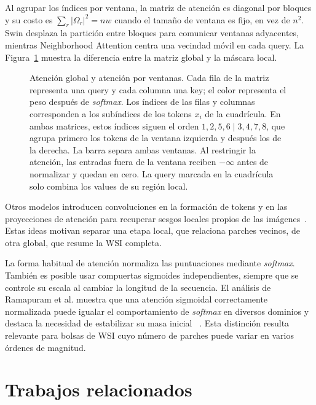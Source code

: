 Al agrupar los índices por ventana, la matriz de atención es diagonal por
bloques y su costo es
\(\sum_r|\Omega_r|^2=nw\) cuando el tamaño de ventana es fijo, en vez de
\(n^2\). Swin desplaza la partición entre bloques para comunicar ventanas
adyacentes, mientras Neighborhood Attention centra una vecindad móvil en cada
query. La Figura~\ref{fig:atencion-ventanas-mapa} muestra la diferencia
entre la matriz global y la máscara local.

\begin{figure}[htbp]
    \centering
    \resizebox{0.92\textwidth}{!}{}
    \caption{Atención global y atención por ventanas. Cada fila de la matriz
    representa una query y cada columna una key; el color representa el
    peso después de \emph{softmax}. Los índices de las filas y columnas
    corresponden a los subíndices de los tokens \(x_i\) de la cuadrícula.
    En ambas matrices, estos índices siguen el orden
    \(1,2,5,6\mid3,4,7,8\), que agrupa primero los tokens de la ventana
    izquierda y después los de la derecha. La barra separa ambas ventanas.
    Al restringir la atención, las entradas
    fuera de la ventana reciben \(-\infty\) antes de normalizar y quedan en
    cero. La query marcada en la cuadrícula solo combina los values de su
    región local.}
    \label{fig:atencion-ventanas-mapa}
\end{figure}

Otros modelos introducen convoluciones en la formación de tokens y en las
proyecciones de atención para recuperar sesgos locales propios de las
imágenes~\cite{wu_cvt_2021}. Estas ideas motivan separar una etapa local, que relaciona parches vecinos, de otra
global, que resume la WSI completa.

La forma habitual de atención normaliza las puntuaciones mediante
\emph{softmax}. También es posible usar compuertas sigmoides independientes,
siempre que se controle su escala al cambiar la longitud de la secuencia. El
análisis de Ramapuram et al. muestra que una atención sigmoidal correctamente
normalizada puede igualar el comportamiento de \emph{softmax} en diversos
dominios y destaca la necesidad de estabilizar su masa inicial
~\cite{ramapuram_sigmoid_2025}. Esta distinción resulta relevante para bolsas
de WSI cuyo número de parches puede variar en varios órdenes de magnitud.

\FloatBarrier

\section{Trabajos relacionados}

